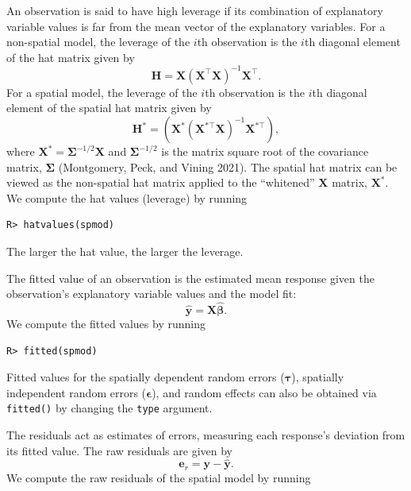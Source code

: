 \documentclass{article}
\begin{document}
An observation is said to have high leverage if its combination of
explanatory variable values is far from the mean vector of the
explanatory variables. For a non-spatial model, the leverage of the
\(i\)th observation is the \(i\)th diagonal element of the hat matrix
given by \begin{equation*}
  \mathbf{H} = \mathbf{X}(\mathbf{X}^\top\mathbf{X})^{-1}\mathbf{X}^\top .
\end{equation*} For a spatial model, the leverage of the \(i\)th
observation is the \(i\)th diagonal element of the spatial hat matrix
given by \begin{equation*}
  \mathbf{H}^* = (\mathbf{X}^* (\mathbf{X}^{* \top} \mathbf{X})^{-1} \mathbf{X}^{* \top}) ,
\end{equation*} where
\(\mathbf{X}^* = \boldsymbol{\Sigma}^{-1/2}\mathbf{X}\) and
\(\boldsymbol{\Sigma}^{-1/2}\) is the matrix square root of the
covariance matrix, \(\boldsymbol{\Sigma}\) (Montgomery, Peck, and Vining
2021). The spatial hat matrix can be viewed as the non-spatial hat
matrix applied to the ``whitened'' \(\mathbf{X}\) matrix,
\(\mathbf{X}^*\). We compute the hat values (leverage) by running

\begin{verbatim}
R> hatvalues(spmod)
\end{verbatim}

The larger the hat value, the larger the leverage.

The fitted value of an observation is the estimated mean response given
the observation's explanatory variable values and the model fit:
\begin{equation*}
  \hat{\mathbf{y}} = \mathbf{X} \hat{\boldsymbol{\beta}}.
\end{equation*} We compute the fitted values by running

\begin{verbatim}
R> fitted(spmod)
\end{verbatim}

Fitted values for the spatially dependent random errors
(\(\boldsymbol{\tau}\)), spatially independent random errors
(\(\boldsymbol{\epsilon}\)), and random effects can also be obtained via
\texttt{fitted()} by changing the \texttt{type} argument.

The residuals act as estimates of errors, measuring each response's
deviation from its fitted value. The raw residuals are given by
\begin{equation*}
  \mathbf{e}_{r} = \mathbf{y} - \hat{\mathbf{y}}.
\end{equation*} We compute the raw residuals of the spatial model by
running
\end{document}
